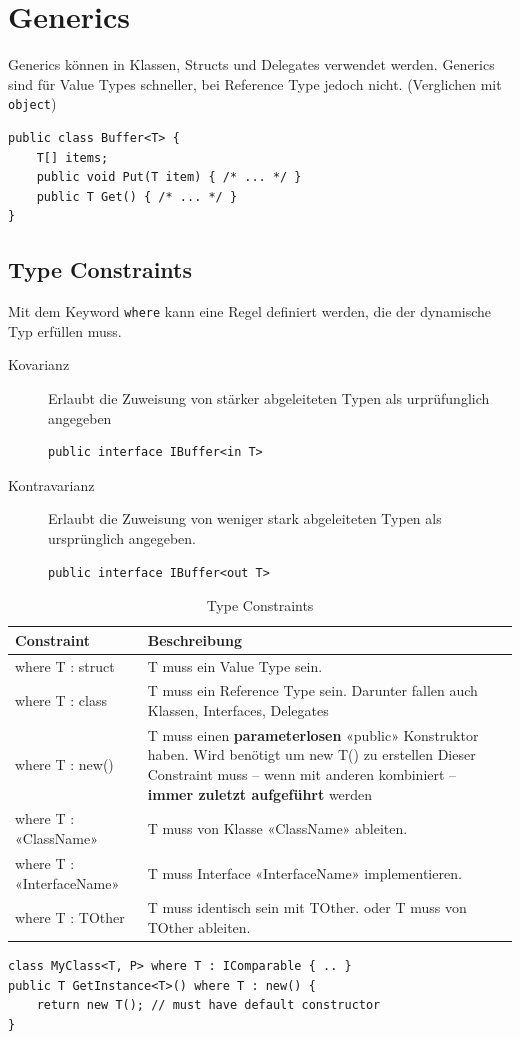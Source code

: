 \section{Generics}
Generics können in Klassen, Structs und Delegates verwendet werden. Generics sind für Value Types schneller, bei Reference Type jedoch nicht. (Verglichen mit \lstinline|object|) 
\begin{lstlisting}
public class Buffer<T> {
	T[] items;
	public void Put(T item) { /* ... */ }
	public T Get() { /* ... */ }
}
\end{lstlisting}

\subsection{Type Constraints}
Mit dem Keyword \lstinline|where| kann eine Regel definiert werden, die der dynamische Typ erfüllen muss.

\begin{description}
	\item[Kovarianz] Erlaubt die Zuweisung von stärker abgeleiteten Typen als urprüfunglich angegeben
\begin{lstlisting}
public interface IBuffer<in T>
\end{lstlisting}
	\item[Kontravarianz] Erlaubt die Zuweisung von weniger stark abgeleiteten Typen als ursprünglich angegeben.
\begin{lstlisting}
public interface IBuffer<out T>
\end{lstlisting}
\end{description}

\begin{table}[h]
	\centering
	\begin{tabu} to \linewidth {l X}
		\toprule 
		Constraint & Beschreibung \\
		\midrule
		where T : struct & T muss ein Value Type sein. \\
		where T : class & T muss ein Reference Type sein. Darunter fallen auch Klassen, Interfaces, Delegates \\
		where T : new() & T muss einen \textbf{parameterlosen} «public» Konstruktor haben. Wird benötigt um new T() zu erstellen
		Dieser Constraint muss – wenn mit anderen kombiniert – \textbf{immer zuletzt 
		aufgeführt} werden  \\
		where T : «ClassName» & T muss von Klasse «ClassName» ableiten. \\
		where T : «InterfaceName» & T muss Interface «InterfaceName» implementieren. \\
		where T : TOther & T muss identisch sein mit TOther.
		oder
		T muss von TOther ableiten.  \\
		\bottomrule
	\end{tabu} 
	\caption{Type Constraints}
\end{table}
\begin{lstlisting}
class MyClass<T, P> where T : IComparable { .. }
public T GetInstance<T>() where T : new() {
	return new T(); // must have default constructor
}
\end{lstlisting}

